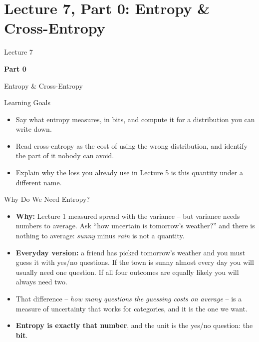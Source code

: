 \section{Lecture 7, Part 0: Entropy \& Cross-Entropy}

\begin{frame}
\vfill
\centering
{\color{RLBlue}\large Lecture 7}

\vspace{0.3em}
{\color{RLBlue}\Large\bfseries Part 0}

\vspace{0.6em}
{\Large Entropy \& Cross-Entropy}
\vfill
\end{frame}

\begin{frame}{Learning Goals}
\begin{itemize}
  \item Say what entropy measures, in bits, and compute it for a distribution you can write down.
  \pause
  \item Read cross-entropy as the cost of using the wrong distribution, and identify the part of it nobody can avoid.
  \pause
  \item Explain why the loss you already use in Lecture 5 is this quantity under a different name.
\end{itemize}
\end{frame}

\begin{frame}{Why Do We Need Entropy?}
\begin{itemize}
  \item \textbf{Why:} Lecture 1 measured spread with the variance -- but variance needs numbers to average. Ask ``how uncertain is tomorrow's weather?'' and there is nothing to average: \emph{sunny} minus \emph{rain} is not a quantity.
  \pause
  \item \textbf{Everyday version:} a friend has picked tomorrow's weather and you must guess it with yes/no questions. If the town is sunny almost every day you will usually need one question. If all four outcomes are equally likely you will always need two.
  \pause
  \item That difference -- \emph{how many questions the guessing costs on average} -- is a measure of uncertainty that works for categories, and it is the one we want.
  \pause
  \item \textbf{Entropy is exactly that number}, and the unit is the yes/no question: the \textbf{bit}.
\end{itemize}
\end{frame}

